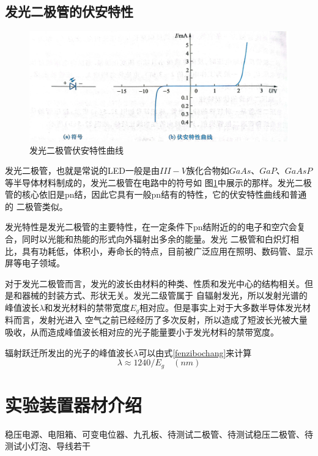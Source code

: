 \documentclass{ctexart}
\begin{document}
  \subsection{发光二极管的伏安特性}
  \begin{figure}[t]
    \centering
    \includegraphics[width=1\textwidth]{faguangfuantexing.jpg}
    \caption{发光二极管伏安特性曲线}\label{faguangfuantexing}
  \end{figure}
  发光二极管，也就是常说的LED一般是由$III-V$族化合物如$GaAs$、$GaP$、$GaAsP$等半导体材料制成的，发光二极管在电路中的符号如
  图\ref{faguangfuantexing}中展示的那样。发光二极管的核心依旧是pn结，因此它具有一般pn结有的特性，它的伏安特性曲线和普通的
  二极管类似。
  
  发光特性是发光二极管的主要特性，在一定条件下pn结附近的的电子和空穴会复合，同时以光能和热能的形式向外辐射出多余的能量。发光
  二极管和白炽灯相比，具有功耗低，体积小，寿命长的特点，目前被广泛应用在照明、数码管、显示屏等电子领域。

  对于发光二极管而言，发光的波长由材料的种类、性质和发光中心的结构相关。但是和器械的封装方式、形状无关。发光二级管属于
  自辐射发光，所以发射光谱的峰值波长$\lambda$和发光材料的禁带宽度$E_{g}$相对应。但是事实上对于大多数半导体发光材料而言，发射光进入
  空气之前已经经历了多次反射，所以造成了短波长光被大量吸收，从而造成峰值波长相对应的光子能量要小于发光材料的禁带宽度。

  辐射跃迁所发出的光子的峰值波长$\lambda$可以由式\ref{fenzibochang}来计算
  \begin{equation}\label{fenzibochang}
    \lambda \approx 1240/E_{g} \quad (nm)
  \end{equation}

\section{实验装置器材介绍}
稳压电源、电阻箱、可变电位器、九孔板、待测试二极管、待测试稳压二极管、待测试小灯泡、导线若干
\end{document}
